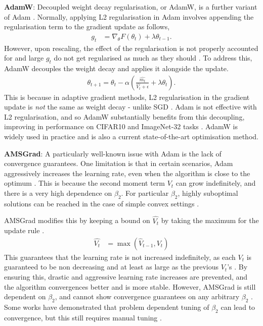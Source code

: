 \textbf{AdamW}: Decoupled weight decay regularisation, or AdamW, is a further variant of Adam \citep{loshchilov2017decoupled}. Normally, applying L2 regularisation in Adam involves appending the regularisation term to the gradient update as follows,
\begin{align}
    g_t &= \nabla_{\theta} F(\theta_t) + \lambda \theta_{t-1}.
\end{align}
However, upon rescaling, the effect of the regularisation is not properly accounted for and large $g_t$ do not get regularised as much as they should \citep{loshchilov2017decoupled}. To address this, AdamW decouples the weight decay and applies it alongside the update.
\begin{align}
    \theta_{t+1} = \theta_t - \alpha \left( \frac{\hat{m_t}}{\hat{V_t} + \epsilon} + \lambda \theta_t \right).
\end{align}
This is because in adaptive gradient methods, L2 regularisation in the gradient update is \textit{not} the same as weight decay - unlike SGD \citep{loshchilov2017decoupled}. Adam is not effective with L2 regularisation, and so AdamW substantially benefits from this decoupling, improving in performance on CIFAR10 and ImageNet-32 tasks \citep{loshchilov2017decoupled}. AdamW is widely used in practice and is also a current state-of-the-art optimisation method.

\textbf{AMSGrad}: A particularly well-known issue with Adam is the lack of convergence guarantees. One limitation is that in certain scenarios, Adam aggressively increases the learning rate, even when the algorithm is close to the optimum \citep{reddi2019asmgrad}. This is because the second moment term $V_t$ can grow indefinitely, and there is a very high dependence on $\beta_2$. For particular $\beta_2$, highly suboptimal solutions can be reached in the case of simple convex settings \citep{reddi2019asmgrad}.

AMSGrad modifies this by keeping a bound on $\hat{V_t}$ by taking the maximum for the update rule \citep{reddi2019asmgrad}.
\begin{align}
    \hat{V_{t}} &= \max(\hat{V}_{t-1}, V_t)
\end{align}
This guarantees that the learning rate is not increased indefinitely, as each $V_t$ is guaranteed to be non decreasing and at least as large as the previous $V_t$'s \citep{reddi2019asmgrad}. By ensuring this, drastic and aggressive learning rate increases are prevented, and the algorithm convergences better and is more stable. However, AMSGrad is still dependent on $\beta_2$, and cannot show convergence guarantees on any arbitrary $\beta_2$ \citep{taniguchi2024adopt}. Some works have demonstrated that problem dependent tuning of $\beta_2$ can lead to convergence, but this still requires manual tuning \citep{taniguchi2024adopt}.

